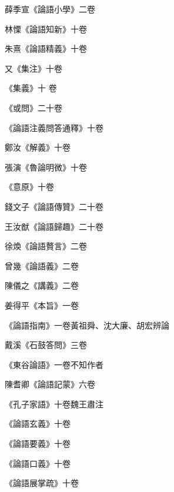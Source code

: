 \begin{pinyinscope}
 薛季宣《論語小學》二卷



 林慄《論語知新》十卷



 朱熹《論語精義》十卷



 又《集注》十卷



 《集義》十
 卷



 《或問》二十卷



 《論語注義問答通釋》十卷



 鄭汝《解義》十卷



 張演《魯論明微》十卷



 《意原》十卷



 錢文子《論語傳贊》二十卷



 王汝猷《論語歸趣》二十卷



 徐煥《論語贅言》二卷



 曾幾《論語義》二卷



 陳儀之《講義》二卷



 姜得平《本旨》一卷



 《論語指南》一卷黃祖舜、沈大廉、胡宏辨論



 戴溪《石鼓答問》三卷



 《東谷論語》一卷不知作者



 陳耆卿《論語記蒙》六卷



 《孔子家語》十卷魏王肅注



 《論語玄義》十卷



 《論語要義》十卷



 《論語口義》十卷



 《論語展掌疏》十卷




\end{pinyinscope}
